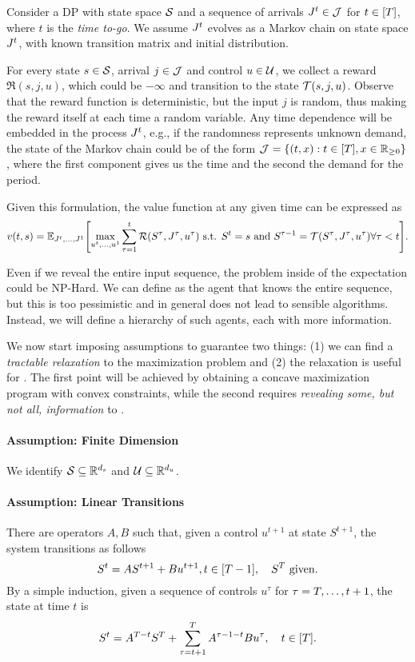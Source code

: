 \documentclass[letterpaper,11pt]{article}
\begin{document}
Consider a DP with state space $\mathcal{S}$ and a sequence of arrivals $J^t\in\mathcal{J}$ for $t\in[T]$, where $t$ is the \emph{time to-go}.
We assume $J^t$ evolves as a Markov chain on state space $J^t$, with known transition matrix and initial distribution.

For every state $s\in\mathcal{S}$, arrival $j\in \mathcal{J}$ and control $u\in\mathcal{U}$, we  collect a reward $\Re(s,j,u)$, which could be $-\infty$ and transition to the state $\mathcal{T}(s,j,u)$.
Observe that the reward function is deterministic, but the input $j$ is random, thus making the reward itself at each time a random variable.
Any time dependence will be embedded in the process $J^t$, e.g., if the randomness represents unknown demand, the state of the Markov chain could be of the form $\mathcal{J}=\{(t,x):t\in[T],x\in\mathbb{R}_{\geq 0}\}$, where the first component gives us the time and the second the demand for the period.

Given this formulation, the value function at any given time can be expressed as
\begin{equation}
v(t,s) = \E_{\Jt,\ldots,J^1}\brk*{\max_{u^t,\ldots,u^1}\sum_{\tau=1}^t\Re(S^\tau,J^\tau,u^\tau) \text{ s.t. }  S^t=s \text{ and } S^{\tau-1}=\Tr(S^\tau,J^\tau,u^\tau) \forall \tau<t }.
\end{equation}

Even if we reveal the entire input sequence, the problem inside of the expectation could be NP-Hard.
We can define \off as the agent that knows the entire sequence, but this is too pessimistic and in general does not lead to sensible algorithms.
Instead, we will define a hierarchy of such agents, each with more information.

We now start imposing assumptions to guarantee two things: (1) we can find a \emph{tractable relaxation} to the maximization problem and (2) the relaxation is useful for \onl.
The first point will be achieved by obtaining a concave maximization program with convex constraints, while the second requires \emph{revealing some, but not all, information} to \off.

\paragraph{Assumption: Finite Dimension}
We identify $\mathcal{S}\subseteq \mathbb{R}^{d_s}$ and $\mathcal{U}\subseteq\mathbb{R}^{d_u}$.

\paragraph{Assumption: Linear Transitions}
There are operators $A,B$ such that, given a control $u^{t+1}$ at state $S^{t+1}$, the system transitions as follows
\[
S^{t} = AS^{t+1} + Bu^{t+1}, t\in[T-1], \quad 
S^T \text{ given}.
\]
By a simple induction, given a sequence of controls $u^\tau$ for $\tau=T,\ldots,t+1$, the state at time $t$ is
\[
S^t = A^{T-t}S^T + \sum_{\tau=t+1}^T A^{\tau-1-t}Bu^\tau, \quad t\in[T].
\]
\end{document}
